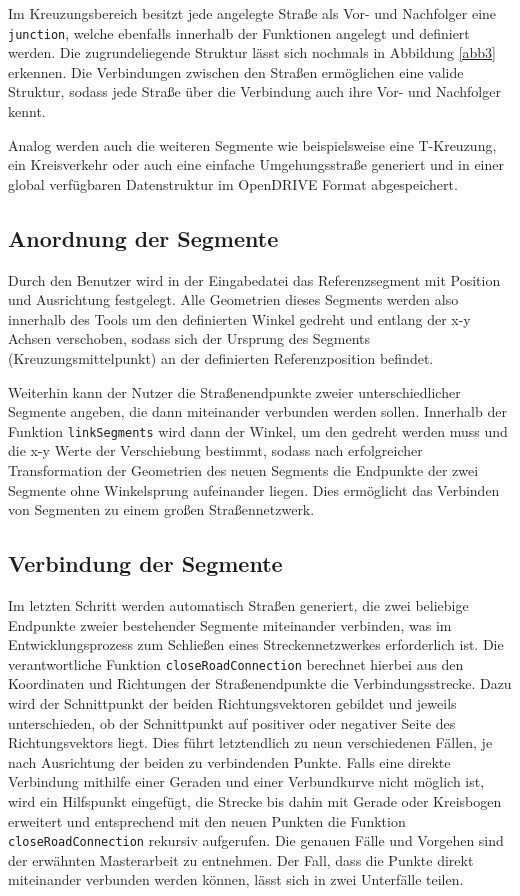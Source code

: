 Im Kreuzungsbereich besitzt jede angelegte Straße als Vor- und Nachfolger eine \texttt{junction}, welche ebenfalls innerhalb der Funktionen angelegt und definiert werden. Die zugrundeliegende Struktur lässt sich nochmals in Abbildung \ref{abb3} erkennen. Die Verbindungen zwischen den Straßen ermöglichen eine valide Struktur, sodass jede Straße über die Verbindung auch ihre Vor- und Nachfolger kennt.

Analog werden auch die weiteren Segmente wie beispielsweise eine T-Kreuzung, ein Kreisverkehr oder auch eine einfache Umgehungsstraße generiert und in einer global verfügbaren Datenstruktur im OpenDRIVE Format abgespeichert.

\subsection{Anordnung der Segmente}
Durch den Benutzer wird in der Eingabedatei das Referenzsegment mit Position und Ausrichtung festgelegt. Alle Geometrien dieses Segments werden also innerhalb des Tools um den definierten Winkel gedreht und entlang der x-y Achsen verschoben, sodass sich der Ursprung des Segments (Kreuzungsmittelpunkt) an der definierten Referenzposition befindet.

Weiterhin kann der Nutzer die Straßenendpunkte zweier unterschiedlicher Segmente angeben, die dann miteinander verbunden werden sollen. Innerhalb der Funktion \texttt{linkSegments} wird dann der Winkel, um den gedreht werden muss und die x-y Werte der Verschiebung bestimmt, sodass nach erfolgreicher Transformation der Geometrien des neuen Segments die Endpunkte der zwei Segmente ohne Winkelsprung aufeinander liegen. Dies ermöglicht das Verbinden von Segmenten zu einem großen Straßennetzwerk.

\subsection{Verbindung der Segmente}
Im letzten Schritt werden automatisch Straßen generiert, die zwei beliebige Endpunkte zweier bestehender Segmente miteinander verbinden, was im Entwicklungsprozess zum Schließen eines Streckennetzwerkes erforderlich ist. Die verantwortliche Funktion \texttt{closeRoadConnection} berechnet hierbei aus den Koordinaten und Richtungen der Straßenendpunkte die Verbindungsstrecke. Dazu wird der Schnittpunkt der beiden Richtungsvektoren gebildet und jeweils unterschieden, ob der Schnittpunkt auf positiver oder negativer Seite des Richtungsvektors liegt. Dies führt letztendlich zu neun verschiedenen Fällen, je nach Ausrichtung der beiden zu verbindenden Punkte. Falls eine direkte Verbindung mithilfe einer Geraden und einer Verbundkurve nicht möglich ist, wird ein Hilfspunkt eingefügt, die Strecke bis dahin mit Gerade oder Kreisbogen erweitert und entsprechend mit den neuen Punkten die Funktion \texttt{closeRoadConnection} rekursiv aufgerufen. Die genauen Fälle und Vorgehen sind der erwähnten Masterarbeit zu entnehmen.\cite{Russ.2019} Der Fall, dass die Punkte direkt miteinander verbunden werden können, lässt sich in zwei Unterfälle teilen.

